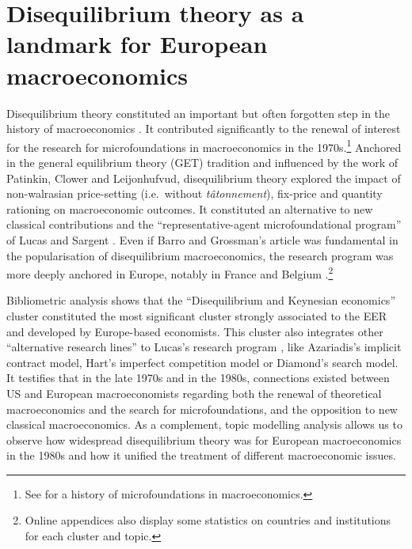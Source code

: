 \documentclass[]{elsarticle} %
\begin{document}
\hypertarget{disequilibrium}{%
\section{Disequilibrium theory as a landmark for European
macroeconomics}\label{disequilibrium}}

Disequilibrium theory constituted an important but often forgotten step
in the history of macroeconomics
\citep{backhouseboianovski2013, plassard2021}. It contributed
significantly to the renewal of interest for the research for
microfoundations in macroeconomics in the 1970s.\footnote{See
  \citet{duartelima2012a} for a history of microfoundations in
  macroeconomics.} Anchored in the general equilibrium theory (GET)
tradition and influenced by the work of Patinkin, Clower and
Leijonhufvud, disequilibrium theory explored the impact of non-walrasian
price-setting (i.e.~without \emph{tâtonnement}), fix-price and quantity
rationing on macroeconomic outcomes. It constituted an alternative to
new classical contributions and the ``representative-agent
microfoundational program'' of Lucas and Sargent
\citetext{\citealp{hoover2012}; \citealp[see also][]{renault2020a}}.
Even if Barro and Grossman's \citeyearpar{barro1971} article was
fundamental in the popularisation of disequilibrium macroeconomics, the
research program was more deeply anchored in Europe, notably in France
and Belgium \citep[and Plassard and Renault, this
issue]{goutsmedt2021}.\footnote{Online appendices also display some
  statistics on countries and institutions for each cluster and topic.}

Bibliometric analysis shows that the ``Disequilibrium and Keynesian
economics'' cluster constituted the most significant cluster strongly
associated to the EER and developed by Europe-based economists. This
cluster also integrates other ``alternative research lines'' to Lucas's
research program \citep[chapter 14]{devroey2016}, like Azariadis's
\citeyearpar{azariadis1975} implicit contract model, Hart's
\citeyearpar{hart1982} imperfect competition model or Diamond's
\citeyearpar{diamond1982} search model. It testifies that in the late
1970s and in the 1980s, connections existed between US and European
macroeconomists regarding both the renewal of theoretical macroeconomics
and the search for microfoundations, and the opposition to new classical
macroeconomics. As a complement, topic modelling analysis allows us to
observe how widespread disequilibrium theory was for European
macroeconomics in the 1980s and how it unified the treatment of
different macroeconomic issues.
\end{document}
